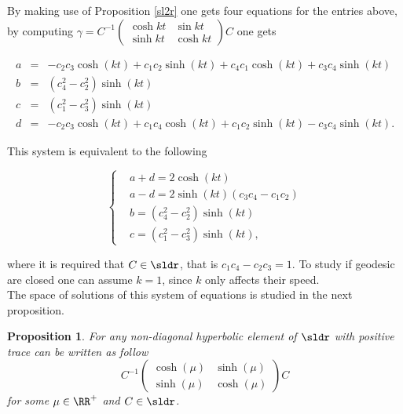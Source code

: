 \documentclass[11pt]{amsart}
\theoremstyle{plain}
\newtheorem{prop}[thm]{Proposition}
\theoremstyle{definition}
\theoremstyle{remark}
\begin{document}
By making use of Proposition \ref{sl2r} one gets four equations for the entries above, by computing $\gamma=C^{-1} \left( \begin{matrix}
\cosh{kt} & \sin{kt} \\
\sinh{kt} & \cosh{kt}
\end{matrix} \right) C$ one gets

\begin{eqnarray*}
a&=&-c_2 c_3 \cosh(kt) + c_1 c_2 \sinh(kt) + c_4 c_1 \cosh(kt) + c_3 c_4 \sinh(kt)\\
b&=&(c_4^2 -c_2^2 ) \sinh(kt)\\
c&=&(c_1^2 - c_3^2) \sinh(kt)\\
d&=&-c_2 c_3 \cosh(kt) + c_1 c_4 \cosh(kt) + c_1 c_2 \sinh(kt) - c_3 c_4 \sinh(kt). 
\end{eqnarray*}

This system is equivalent to the following

\begin{equation}\label{hyperbolic-equation}
    \begin{cases}
        & a+d=2 \cosh(kt)\\
        & a-d=2 \sinh(kt) (c_3 c_4-c_1 c_2)\\
        & b=(c_4^2 - c_2^2) \sinh(kt)\\
        & c=(c_1^2 - c_3^2) \sinh(kt),    
    \end{cases}
\end{equation}

where  it is required that $C \in \sldr$, that is $c_1 c_4 - c_2 c_3 = 1$. To study if geodesic are closed one can assume $k=1$, since $k$ only affects their speed. \\

The space of solutions of this system of equations is studied in the next proposition. \\

\begin{prop} \label{hyperbolic-space}
For any non-diagonal hyperbolic element of $\sldr$ with positive trace can be written as follow $$ C^{-1} \left(\begin{array}{cc}
\cosh(\mu) & \sinh(\mu) \\
\sinh(\mu) & \cosh(\mu) \end{array}\right) C$$ for some $\mu \in \RR^{+}$ and $C \in \sldr$. 
\end{prop}
\end{document}

